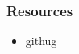 \documentclass{beamer}
\begin{document}
\begin{frame}
\frametitle{Resources}

\begin{itemize}
\item{githug}
\end{itemize}
  
\end{frame}
\end{document}

